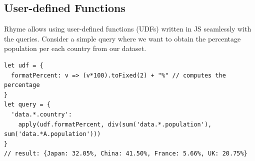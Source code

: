 \documentclass[runningheads]{llncs}
\newcommand{\lang}{Rhyme}
\begin{document}





\vspace{-3mm}
\subsection{User-defined Functions}
\vspace{-2mm}
\lang{} allows using user-defined functions (UDFs) written in JS seamlessly with the
queries.
Consider a simple query where we want to obtain the percentage population per each
country from our dataset.

\begin{lstlisting}[style=JavaScript, columns=flexible]
let udf = {
  formatPercent: v => (v*100).toFixed(2) + "%" // computes the percentage 
}
let query = {
  'data.*.country':
    apply(udf.formatPercent, div(sum('data.*.population'), sum('data.*A.population')))
}
// result: {Japan: 32.05%, China: 41.50%, France: 5.66%, UK: 20.75%}
\end{lstlisting}
\end{document}
